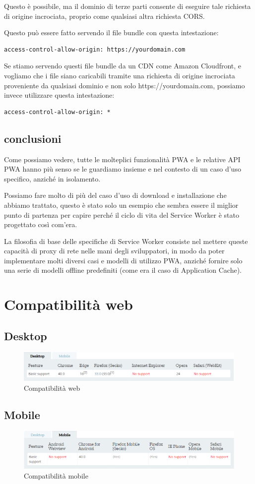 \documentclass[italian]{article}
\begin{document}
Questo è possibile, ma il dominio di terze parti consente di eseguire tale richiesta di origine incrociata, proprio come qualsiasi altra richiesta CORS.

Questo può essere fatto servendo il file bundle con questa intestazione:
\begin{lstlisting}
access-control-allow-origin: https://yourdomain.com
\end{lstlisting}
Se stiamo servendo questi file bundle da un CDN come Amazon Cloudfront, e vogliamo che i file siano caricabili tramite una richiesta di origine incrociata proveniente da qualsiasi dominio e non solo https://yourdomain.com, possiamo invece utilizzare questa intestazione:
\begin{lstlisting}
access-control-allow-origin: *
\end{lstlisting}
\subsection{conclusioni}
Come possiamo vedere, tutte le molteplici funzionalità PWA e le relative API PWA hanno più senso se le guardiamo insieme e nel contesto di un caso d'uso specifico, anziché in isolamento.

Possiamo fare molto di più del caso d'uso di download e installazione che abbiamo trattato, questo è stato solo un esempio che sembra essere il miglior punto di partenza per capire perché il ciclo di vita del Service Worker è stato progettato così com'era.

La filosofia di base delle specifiche di Service Worker consiste nel mettere queste capacità di proxy di rete nelle mani degli sviluppatori, in modo da poter implementare molti diversi casi e modelli di utilizzo PWA, anziché fornire solo una serie di modelli offline predefiniti (come era il caso di Application Cache).
\pagebreak
\section{Compatibilità web}
\subsection{Desktop}
\begin{figure}[h]
	\centering
	\includegraphics[width=1\linewidth]{CompWeb}
	\caption{Compatibilità web}
	\label{fig:Compatibilità web}
\end{figure}
\subsection{Mobile}
\begin{figure}[h]
	\centering
	\includegraphics[width=1\linewidth]{CompMobile}
	\caption{Compatibilità mobile}
	\label{fig:Compatibilità mobile}
\end{figure}
\end{document}
